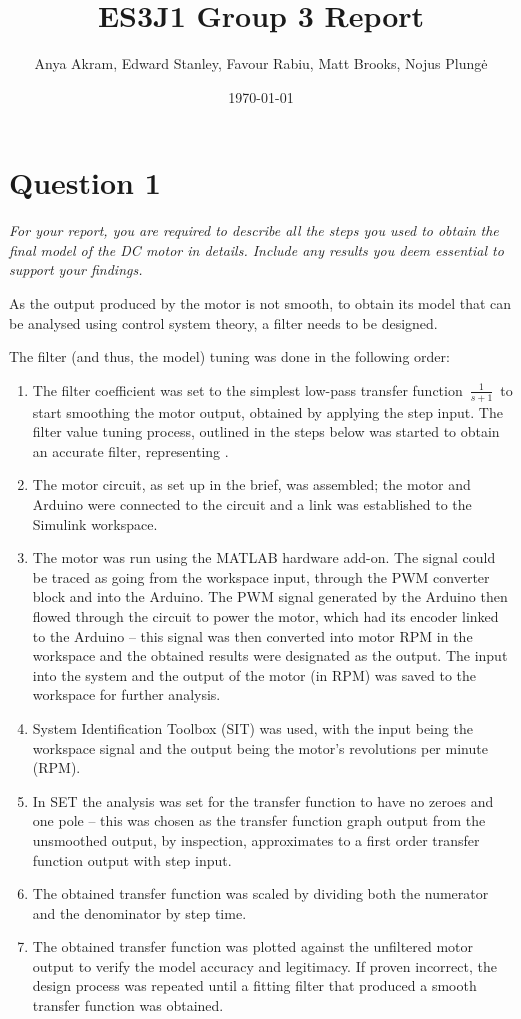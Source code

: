 \documentclass[11pt, onecolumn]{article}
\title{ES3J1 Group 3 Report}
\author{Anya Akram, Edward Stanley, Favour Rabiu, Matt Brooks, Nojus Plungė}
\date{\today}
\begin{document}
\maketitle

\section*{Question 1}
\par \textit{For your report, you are required to describe all the steps you used to obtain the final model of the DC motor in details. Include any results you deem essential to support your findings.}
\noindent\makebox[\linewidth]{\rule{\textwidth}{0.4pt}}
\par As the output produced by the motor is not smooth, to obtain its model that can be analysed using control system theory, a filter needs to be designed.
\par The filter (and thus, the model) tuning was done in the following order:
\begin{enumerate}
    \item The filter coefficient was set to the simplest low-pass transfer function $\frac{1}{s+1}$ to start smoothing the motor output, obtained by applying the step input. The filter value tuning process, outlined in the steps below was started to obtain an accurate filter, representing .
    \item The motor circuit, as set up in the brief, was assembled; the motor and Arduino were connected to the circuit and a link was established to the Simulink workspace.
    \item The motor was run using the MATLAB hardware add-on. The signal could be traced as going from the workspace input, through the PWM converter block and into the Arduino. The PWM signal generated by the Arduino then flowed through the circuit to power the motor, which had its encoder linked to the Arduino – this signal was then converted into motor RPM in the workspace and the obtained results were designated as the output. The input into the system and the output of the motor (in RPM) was saved to the workspace for further analysis.
    \item System Identification Toolbox (SIT) was used, with the input being the workspace signal and the output being the motor's revolutions per minute (RPM).
    \item In SET the analysis was set for the transfer function to have no zeroes and one pole – this was chosen as the transfer function graph output from the unsmoothed output, by inspection, approximates to a first order transfer function output with step input.
    \item The obtained transfer function was scaled by dividing both the numerator and the denominator by step time.
    \item The obtained transfer function was plotted against the unfiltered motor output to verify the model accuracy and legitimacy. If proven incorrect, the design process was repeated until a fitting filter that produced a smooth transfer function was obtained.
\end{enumerate}
\end{document}
